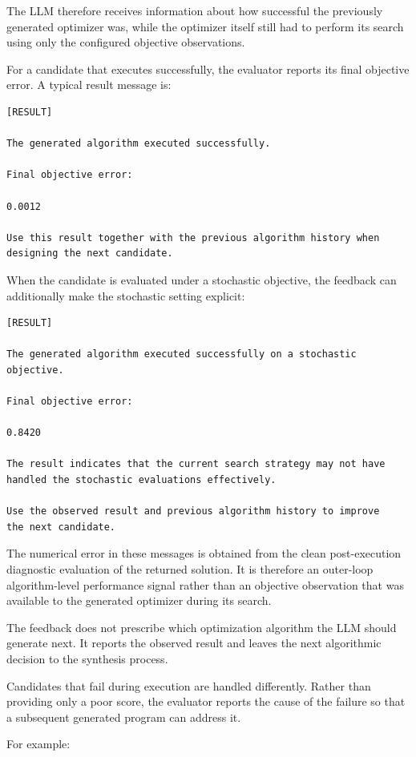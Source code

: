The LLM therefore receives information about how successful the previously
generated optimizer was, while the optimizer itself still had to perform its
search using only the configured objective observations.

For a candidate that executes successfully, the evaluator reports its final
objective error. A typical result message is:

\begin{verbatim}
[RESULT]

The generated algorithm executed successfully.

Final objective error:

0.0012

Use this result together with the previous algorithm history when
designing the next candidate.
\end{verbatim}

When the candidate is evaluated under a stochastic objective, the feedback
can additionally make the stochastic setting explicit:

\begin{verbatim}
[RESULT]

The generated algorithm executed successfully on a stochastic objective.

Final objective error:

0.8420

The result indicates that the current search strategy may not have
handled the stochastic evaluations effectively.

Use the observed result and previous algorithm history to improve
the next candidate.
\end{verbatim}

The numerical error in these messages is obtained from the clean
post-execution diagnostic evaluation of the returned solution. It is
therefore an outer-loop algorithm-level performance signal rather than an
objective observation that was available to the generated optimizer during
its search.

The feedback does not prescribe which optimization algorithm the LLM should
generate next. It reports the observed result and leaves the next algorithmic
decision to the synthesis process.

Candidates that fail during execution are handled differently. Rather than
providing only a poor score, the evaluator reports the cause of the failure so
that a subsequent generated program can address it.

For example:

